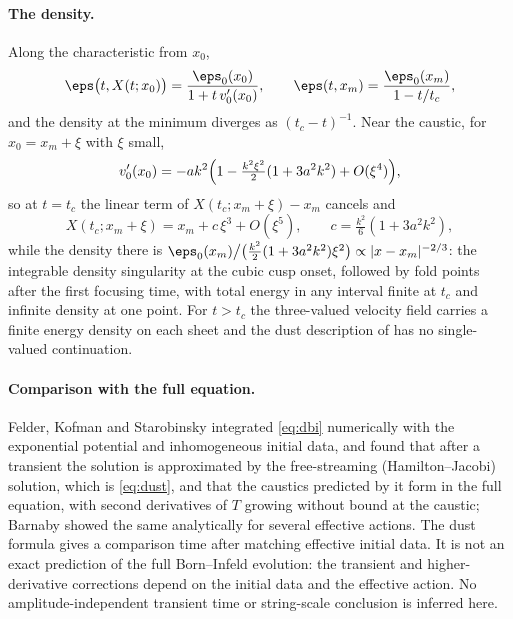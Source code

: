 \paragraph*{The density.} Along the characteristic from $x_0$,
\[
\eps\bigl(t,X(t;x_0)\bigr) = \frac{\eps_0(x_0)}{1+t\,v_0'(x_0)},\qquad \eps(t,x_m) = \frac{\eps_0(x_m)}{1 - t/t_c},
\]
and the density at the minimum diverges as $(t_c - t)^{-1}$. Near the caustic, for $x_0 = x_m + \xi$ with $\xi$ small,
\[
v_0'(x_0) = -ak^2\Bigl(1 - \tfrac{k^2\xi^2}{2}(1 + 3a^2k^2)+O(\xi^4)\Bigr),
\]
so at $t=t_c$ the linear term of $X(t_c;x_m+\xi) - x_m$ cancels and
\[
X(t_c;x_m+\xi) = x_m + c\,\xi^3 + O(\xi^5),\qquad c = \tfrac{k^2}{6}(1+3a^2k^2),
\]
while the density there is $\eps_0(x_m)\big/\big(\tfrac{k^2}{2}(1+3a^2k^2)\xi^2\big)\propto |x-x_m|^{-2/3}$: the integrable density singularity at the cubic cusp onset, followed by fold points after the first focusing time, with total energy in any interval finite at $t_c$ and infinite density at one point. For $t>t_c$ the three-valued velocity field carries a finite energy density on each sheet and the dust description of \cite{Sen02field} has no single-valued continuation.

\paragraph*{Comparison with the full equation.} Felder, Kofman and Starobinsky \cite{FKS02} integrated \eqref{eq:dbi} numerically with the exponential potential and inhomogeneous initial data, and found that after a transient the solution is approximated by the free-streaming (Hamilton--Jacobi) solution, which is \eqref{eq:dust}, and that the caustics predicted by it form in the full equation, with second derivatives of $T$ growing without bound at the caustic; Barnaby \cite{Barnaby04} showed the same analytically for several effective actions. The dust formula gives a comparison time after matching effective initial data. It is not an exact prediction of the full Born--Infeld evolution: the transient and higher-derivative corrections depend on the initial data and the effective action. No amplitude-independent transient time or string-scale conclusion is inferred here.
